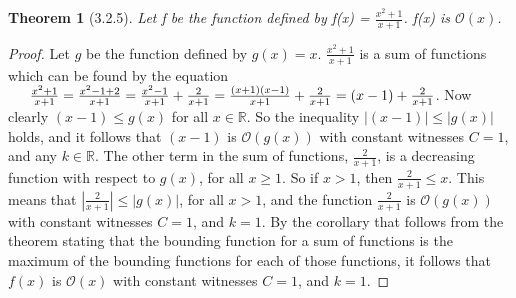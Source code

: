 \documentclass[a4paper, 12pt]{article}
\theoremstyle{plain}
\newtheorem*{theorem*}{Theorem}
\begin{document}
	
	\begin{theorem*}[3.2.5]
		Let f be the function defined by f(x) = $\frac{x^{2} + 1}{x + 1}$. \newline f(x) is $\mathcal{O}(x)$.
	\end{theorem*}
	
	\begin{proof}
		Let $g$ be the function defined by $g(x) = x$. $\frac{x^{2} + 1}{x + 1}$ is a sum of functions which can be found by the equation $\newline \newline \indent \frac{x^{2} + 1}{x + 1} = \frac{x^{2} - 1 + 2}{x + 1} = \frac{x^{2} - 1}{x + 1} + \frac{2}{x + 1} = \frac{(x + 1)(x - 1)}{x + 1} + \frac{2}{x + 1} = (x-1) + \frac{2}{x + 1}$. \newline \newline Now clearly $(x-1) \le g(x)$ for all $x \in \mathbb{R}$. So the inequality $|(x-1)| \le |g(x)|$ holds, and it follows that $(x - 1)$ is $\mathcal{O}(g(x))$ with constant witnesses $C = 1$, and any $k \in \mathbb{R}$. The other term in the sum of functions, $\frac{2}{x + 1}$, is a decreasing function with respect to $g(x)$, for all $x \ge 1$. So if $x > 1$, then $\frac{2}{x + 1} \le x$. This means that $|\frac{2}{x + 1}| \le |g(x)|$, for all $x > 1$, and the function $\frac{2}{x + 1}$ is $\mathcal{O}(g(x))$ with constant witnesses $C = 1$, and $k = 1$. By the corollary that follows from the theorem stating that the bounding function for a sum of functions is the maximum of the bounding functions for each of those functions, it follows that $f(x)$ is $\mathcal{O}(x)$ with constant witnesses $C = 1$, and $k = 1$.
	\end{proof}
\end{document}
